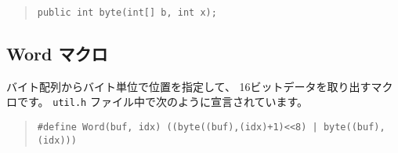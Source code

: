 \begin{quote}
\begin{verbatim}
public int byte(int[] b, int x); 
\end{verbatim}
\end{quote}

\subsection{Word マクロ}

バイト配列からバイト単位で位置を指定して、
16ビットデータを取り出すマクロです。
\verb/util.h/ ファイル中で次のように宣言されています。

\begin{quote}
\begin{verbatim}
#define Word(buf, idx) ((byte((buf),(idx)+1)<<8) | byte((buf),(idx)))
\end{verbatim}
\end{quote}
